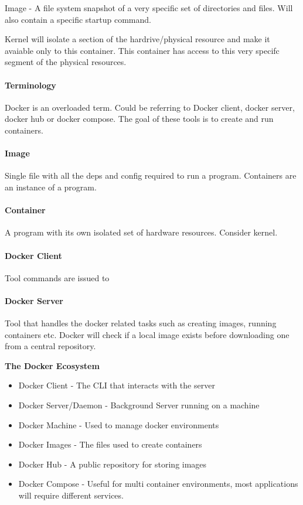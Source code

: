 \documentclass[a4paper, 11pt]{book}
\begin{document}
    Image - A file system snapshot of a very specific set of directories and files.
    Will also contain a specific startup command.

    Kernel will isolate a section of the hardrive/physical resource and make it avaiable only to this container.
    This container has access to this very specifc segment of the physical resources.

    \paragraph{Terminology}
    Docker is an overloaded term.
    Could be referring to Docker client, docker server, docker hub or docker compose.
    The goal of these tools is to create and run containers.

    \paragraph{Image}
    Single file with all the deps and config required to run a program.
    Containers are an instance of a program.

    \paragraph{Container}
    A program with its own isolated set of hardware resources. Consider kernel.

    \paragraph{Docker Client}
    Tool commands are issued to

    \paragraph{Docker Server}
    Tool that handles the docker related tasks such as creating images, running containers etc.
    Docker will check if a local image exists before downloading one from a central repository.


    \textbf{The Docker Ecosystem}

    \begin{itemize}[label=-]
        \item Docker Client - The CLI that interacts with the server
        \item Docker Server/Daemon - Background Server running on a machine
        \item Docker Machine - Used to manage docker environments
        \item Docker Images - The files used to create containers
        \item Docker Hub - A public repository for storing images
        \item Docker Compose - Useful for multi container environments, most applications will require different services.
    \end{itemize}
\end{document}
